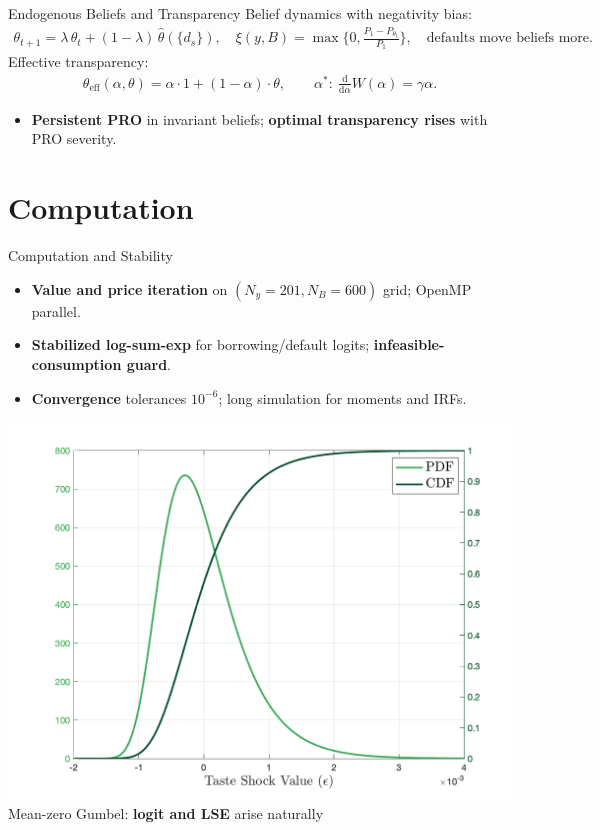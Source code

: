 \documentclass[aspectratio=169,11pt,professionalfonts]{beamer}
\newcommand{\1}{\mathbb{1}}
\begin{document}
\begin{frame}{Endogenous Beliefs and Transparency}
  Belief dynamics with negativity bias:
  \begin{gather*}
    \theta_{t+1}=\lambda\,\theta_t+(1{-}\lambda)\,\widehat\theta(\{d_s\}),\quad
    \xi(y,B)=\max\Big\{0,\tfrac{P_1-P_{\theta_t}}{P_1}\Big\},\quad \text{defaults move beliefs more}.
  \end{gather*}
  Effective transparency:
  \begin{gather*}
    \theta_{\mathrm{eff}}(\alpha,\theta)=\alpha\cdot 1+(1{-}\alpha)\cdot\theta,\qquad
    \alpha^*:\ \frac{\mathrm d}{\mathrm d\alpha}W(\alpha)=\gamma\alpha.
  \end{gather*}
  \begin{itemize}
    \item \textbf{Persistent PRO} in invariant beliefs; \textbf{optimal transparency rises} with PRO severity.
  \end{itemize}
\end{frame}

\section{Computation}

\begin{frame}{Computation and Stability}
  \begin{itemize}
    \item \textbf{Value and price iteration} on $(N_y{=}201, N_B{=}600)$ grid; OpenMP parallel.
    \item \textbf{Stabilized log-sum-exp} for borrowing/default logits; \textbf{infeasible-consumption guard}.
    \item \textbf{Convergence} tolerances $10^{-6}$; long simulation for moments and IRFs.
  \end{itemize}
  \vspace{0.5em}
  \centering
  \includegraphics[width=0.6\linewidth]{../../paper/Long_term/gumbel_distribution.png}
  \\
  {\scriptsize Mean-zero Gumbel: \textbf{logit and LSE} arise naturally}
\end{frame}
\end{document}
